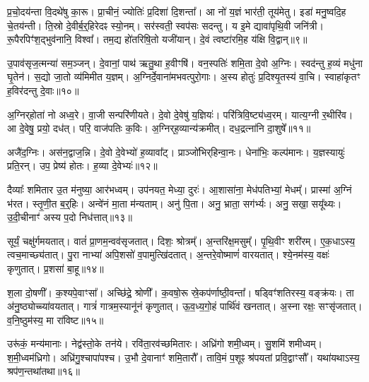 प्र॒चो॒दय॑न्ता वि॒दथे॑षु का॒रू।
प्रा॒चीनं॒ ज्योतिः॑ प्र॒दिशा॑ दि॒शन्ता᳚।
आ नो॑ य॒ज्ञं भार॑ती॒ तूय॑मेतु।
इडा॑ मनु॒ष्वदि॒ह चे॒तय॑न्ती।
ति॒स्रो दे॒वीर्ब॒र्‌॒\mbox{}हिरेदꣴ स्यो॒नम्।
सर॑स्वती॒ स्वप॑सः सदन्तु।
य इ॒मे द्यावा॑पृथि॒वी जनि॑त्री।
रू॒पैरपिꣳ॑श॒द्भुव॑नानि॒ विश्वा᳚।
तम॒द्य हो॑तरिषि॒तो यजी॑यान्।
दे॒वं त्वष्टा॑रमि॒ह य॑क्षि वि॒द्वान्॥९॥\ip

उ॒पाव॑सृज॒त्मन्या॑ सम॒ञ्जन्।
दे॒वानां॒ पाथ॑ ऋतु॒था ह॒वीꣳषि॑।
वन॒स्पतिः॑ शमि॒ता दे॒वो अ॒ग्निः।
स्वद॑न्तु ह॒व्यं मधु॑ना घृ॒तेन॑।
स॒द्यो जा॒तो व्य॑मिमीत य॒ज्ञम्।
अ॒ग्निर्दे॒वाना॑मभवत्पुरो॒गाः।
अ॒स्य होतुः॑ प्र॒दिश्यृ॒तस्य॑ वा॒चि।
स्वाहा॑कृतꣳ ह॒विर॑दन्तु दे॒वाः॥१०॥\ip\anuvakamend[य॒ज्ञैः स्यो॒नं यज॑ध्यै वि॒द्वान॒ष्टौ च॑]

अ॒ग्निर्‌\mbox{}होता॑ नो अध्व॒रे।
वा॒जी सन्परि॑णीयते।
दे॒वो दे॒वेषु॑ य॒ज्ञियः॑।
परि॑त्रिवि॒ष्ट्य॑ध्व॒रम्।
यात्य॒ग्नी र॒थीरि॑व।
आ दे॒वेषु॒ प्रयो॒ दध॑त्।
परि॒ वाज॑पतिः क॒विः।
अ॒ग्निर्‌\mbox{}ह॒व्यान्य॑क्रमीत्।
दध॒द्रत्ना॑नि दा॒शुषे᳚॥११॥\ip\anuvakamend[अ॒ग्निर्‌\mbox{}होता॑ नो॒ नव॑]

अजै॑द॒ग्निः।
अस॑न॒द्वाज॒न्नि।
दे॒वो दे॒वेभ्यो॑ ह॒व्यावा᳚ट्।
प्राञ्जो॑भिर्‌\mbox{}हिन्वा॒नः।
धेना॑भिः॒ कल्प॑मानः।
य॒ज्ञस्यायुः॑ प्रति॒रन्।
उप॒ प्रेष्य॑ होतः।
ह॒व्या दे॒वेभ्यः॑॥१२॥\ip\anuvakamend[अजै॑द॒ष्टौ]

दैव्याः᳚ शमितार उ॒त म॑नुष्या॒ आर॑भध्वम्।
उप॑नयत॒ मेध्या॒ दुरः॑।
आ॒शासा॑ना॒ मेध॑पतिभ्यां॒ मेधम्᳚।
प्रास्मा॑ अ॒ग्निं भ॑रत।
स्तृ॒णी॒त ब॒र्॒हिः।
अन्वे॑नं मा॒ता म॑न्यताम्।
अनु॑ पि॒ता।
अनु॒ भ्राता॒ सग॑र्भ्यः।
अनु॒ सखा॒ सयू᳚थ्यः।
उ॒दी॒चीनाꣳ॑ अस्य प॒दो निध॑त्तात्॥१३॥\ip

सूर्यं॒ चक्षु॑र्गमयतात्।
वातं॑ प्रा॒णम॒न्वव॑\-सृजतात्।
दिशः॒ श्रोत्रम्᳚।
अ॒न्तरि॑क्ष॒मसुम्᳚।
पृ॒थि॒वीꣳ शरी॑रम्।
ए॒क॒धा\-ऽस्य॒ त्वच॒माच्छ्य॑तात्।
पु॒रा नाभ्या॑ अपि॒शसो॑ व॒पामुत्खि॑दतात्।
अ॒न्तरे॒वोष्माणं॑ वारयतात्।
श्ये॒नम॑स्य॒ वक्षः॑ कृणुतात्।
प्र॒शसा॑ बा॒हू॥१४॥\ip

श॒ला दो॒षणी᳚।
क॒श्यपे॒वाꣳसा᳚।
अच्छि॑द्रे॒ श्रोणी᳚।
क॒वषो॒रू स्रे॒कप॑र्णाष्ठी॒वन्ता᳚।
षड्विꣳ॑शतिरस्य॒ वङ्क्र॑यः।
ता अ॑नु॒ष्ठ्योच्च्या॑वयतात्।
गात्रं॑ गात्रम॒स्यानू॑नं कृणुतात्।
ऊ॒व॒ध्य॒गो॒हं पार्थि॑वं खनतात्।
अ॒स्ना रक्षः॒ सꣳसृ॑जतात्।
व॒नि॒ष्ठुम॑स्य॒ मा रा॑विष्ट॥१५॥\ip

उरू॑कं॒ मन्य॑मानाः।
नेद्व॑स्तो॒के तन॑ये।
रवि॑ता॒रव॑च्छमितारः।
अध्रि॑गो शमी॒ध्वम्।
सु॒शमि॑ शमीध्वम्।
श॒मी॒ध्वम॑ध्रिगो।
अध्रि॑गु॒श्चापा॑पश्च।
उ॒भौ दे॒वानाꣳ॑ शमि॒तारौ᳚।
तावि॒मं प॒शूꣴ श्र॑पयतां प्रवि॒द्वाꣳसौ᳚।
यथा॑यथा\-ऽस्य॒ श्रप॑ण॒न्तथा॑तथा॥१६॥\ip\anuvakamend[ध॒त्ता॒द्बा॒हू मा रा॑विष्ट॒ तथा॑तथा]


